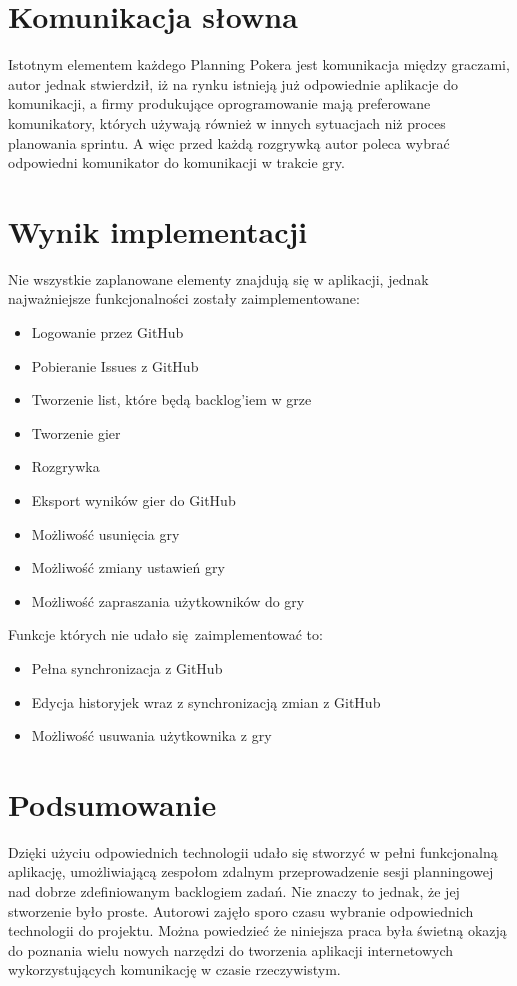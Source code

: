 \section{Komunikacja słowna}

Istotnym elementem każdego Planning Pokera jest komunikacja między graczami,
autor jednak stwierdził,
iż na rynku istnieją już odpowiednie aplikacje do komunikacji,
a firmy produkujące oprogramowanie mają preferowane komunikatory, których używają
również w innych sytuacjach niż proces planowania sprintu.
A więc przed każdą rozgrywką autor poleca wybrać odpowiedni komunikator do komunikacji w trakcie gry.


\section{Wynik implementacji}

Nie wszystkie zaplanowane elementy znajdują się w aplikacji,
jednak najważniejsze funkcjonalności zostały zaimplementowane:

 \begin{itemize}
	\item Logowanie przez GitHub
	\item Pobieranie Issues z GitHub
	\item Tworzenie list, które będą backlog'iem w grze
	\item Tworzenie gier
	\item Rozgrywka
	\item Eksport wyników gier do GitHub
	\item Możliwość usunięcia gry
	\item Możliwość zmiany ustawień gry
	\item Możliwość zapraszania użytkowników do gry
\end{itemize}

Funkcje których nie udało się zaimplementować to:

\begin{itemize}
	\item Pełna synchronizacja z GitHub
	\item Edycja historyjek wraz z synchronizacją zmian z GitHub
	\item Możliwość usuwania użytkownika z gry
\end{itemize}

\section{Podsumowanie}

Dzięki użyciu odpowiednich technologii udało się stworzyć w pełni funkcjonalną aplikację,
umożliwiającą zespołom zdalnym przeprowadzenie sesji planningowej nad dobrze
zdefiniowanym backlogiem zadań.
Nie znaczy to jednak, że jej stworzenie było proste.
Autorowi zajęło sporo czasu wybranie odpowiednich technologii do projektu.
Można powiedzieć że niniejsza praca była świetną okazją do poznania
wielu nowych narzędzi do tworzenia aplikacji internetowych wykorzystujących
komunikację w czasie rzeczywistym.

